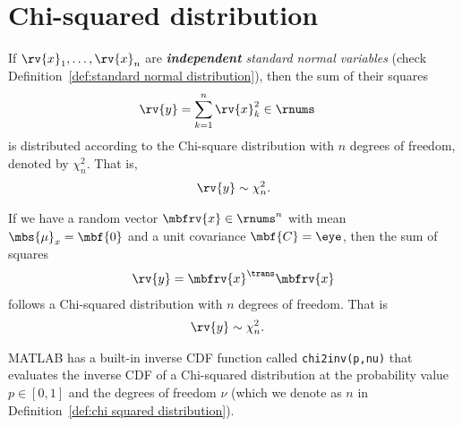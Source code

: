 \section{Chi-squared distribution}
\begin{mydefinition}
    \label{def:chi squared distribution}
    If $\rv{x}_{1}, \ldots, \rv{x}_{n}$ are \emph{\textbf{independent} standard normal variables} (check Definition~\ref{def:standard normal distribution}), then the sum of their squares 
    \begin{align}
        \rv{y} &= \sum_{k=1}^{n}\rv{x}_{k}^{2} \in \rnums
    \end{align}
    is distributed according to the Chi-square distribution with $n$ degrees of freedom, denoted by $\chi_{n}^{2}$. That is,
    \begin{align}
        \rv{y}\sim\chi^{2}_{n}.
    \end{align}
\end{mydefinition}
%
\begin{myremark}
    If we have a random vector $\mbfrv{x}\in\rnums^{n}$ with mean $\mbs{\mu}_{x}=\mbf{0}$ and a unit covariance $\mbf{C}=\eye$, then the sum of squares    
    \begin{align}
        \rv{y} &= \mbfrv{x}^{\trans}\mbfrv{x}\\        
    \end{align}
    follows a Chi-squared distribution with $n$ degrees of freedom. That is
    \begin{align}
        \rv{y} &\sim\chi^{2}_{n}.
    \end{align}
\end{myremark}
%
\begin{myremark}
    MATLAB has a built-in inverse CDF function called \texttt{chi2inv(p,nu)} that evaluates the inverse CDF of a Chi-squared distribution at the probability value $p\in[0,1]$ and the degrees of freedom $\nu$ (which we denote as $n$ in Definition~\ref{def:chi squared distribution}). 
\end{myremark}

